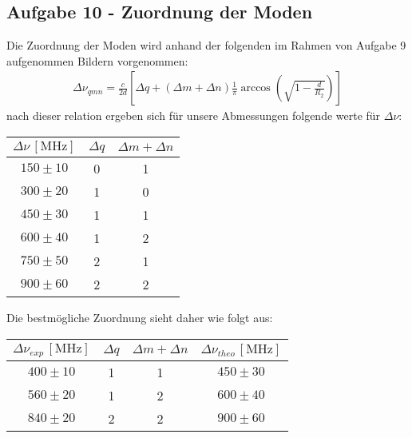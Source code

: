 \subsection{Aufgabe 10 - Zuordnung der Moden}
Die Zuordnung der Moden wird anhand der folgenden im Rahmen von Aufgabe 9 aufgenommen Bildern vorgenommen:
\begin{align}
\Delta \nu_{qmn} = 
\frac{c}{2d}\left[ \Delta q + (\Delta m + \Delta n) \frac{1}{\pi} \arccos \left(\sqrt{1-\frac{d}{R_2}} \right)  \right]
\end{align}
nach dieser relation ergeben sich für unsere Abmessungen folgende werte für $\Delta \nu$:
\begin{center}
\begin{tabular}{c|c|c}
$\Delta\nu\,[\text{MHz}]$ & $\Delta q$ & $\Delta m + \Delta n$ \\\hline
$150 \pm 10$ & 0 & 1 \\
$300 \pm 20$ & 1 & 0 \\
$450 \pm 30$ & 1 & 1 \\
$600 \pm 40$ & 1 & 2 \\
$750 \pm 50$ & 2 & 1 \\
$900 \pm 60$ & 2 & 2 \\
\end{tabular}
\end{center}

Die bestmögliche Zuordnung sieht daher wie folgt aus:

\begin{center}
\begin{tabular}{c|c|c|c}
$\Delta\nu_{exp}\,[\text{MHz}]$ & $\Delta q$ & $\Delta m + \Delta n$ & $\Delta\nu_{theo}\,[\text{MHz}]$ \\\hline
$400 \pm 10$ & 1 & 1 & $450 \pm 30$ \\
$560 \pm 20$ & 1 & 2 & $600 \pm 40$ \\
$840 \pm 20$ & 2 & 2 & $900 \pm 60$
\end{tabular}
\end{center}
